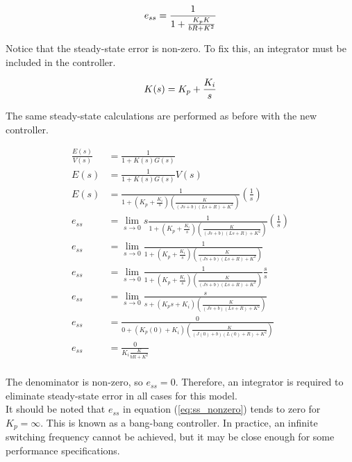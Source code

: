 \documentclass[10pt,conference,compsoc]{IEEEtran}
\begin{document}
\begin{equation} \label{eq:ss_nonzero}
  e_{ss} = \frac{1}{1 + \frac{K_p K}{bR+K^2}} \\
\end{equation}

\noindent Notice that the steady-state error is non-zero. To fix this, an
integrator must be included in the controller.

\begin{equation*}
  K(s) = K_p + \frac{K_i}{s} \\
\end{equation*}

\noindent The same steady-state calculations are performed as before with the
new controller.

\begin{align*}
  \frac{E(s)}{V(s)} &= \frac{1}{1 + K(s)G(s)} \\
  E(s) &= \frac{1}{1 + K(s)G(s)} V(s) \\
  E(s) &= \frac{1}{1 + \left(K_p + \frac{K_i}{s}\right)
    \left(\frac{K}{(Js+b)(Ls+R)+K^2}\right)} \left(\frac{1}{s}\right) \\
  e_{ss} &= \lim_{s\to0} s \frac{1}{1 + \left(K_p + \frac{K_i}{s}\right)
    \left(\frac{K}{(Js+b)(Ls+R)+K^2}\right)} \left(\frac{1}{s}\right) \\
  e_{ss} &= \lim_{s\to0} \frac{1}{1 + \left(K_p + \frac{K_i}{s}\right)
    \left(\frac{K}{(Js+b)(Ls+R)+K^2}\right)} \\
  e_{ss} &= \lim_{s\to0} \frac{1}{1 + \left(K_p + \frac{K_i}{s}\right)
    \left(\frac{K}{(Js+b)(Ls+R)+K^2}\right)} \frac{s}{s} \\
  e_{ss} &= \lim_{s\to0} \frac{s}{s + \left(K_p s + K_i\right)
    \left(\frac{K}{(Js+b)(Ls+R)+K^2}\right)} \\
  e_{ss} &= \frac{0}{0 + (K_p (0) + K_i)
    \left(\frac{K}{(J(0)+b)(L(0)+R)+K^2}\right)} \\
  e_{ss} &= \frac{0}{K_i \frac{K}{bR+K^2}} \\
\end{align*}

\noindent The denominator is non-zero, so $e_{ss} = 0$. Therefore, an integrator
is required to eliminate steady-state error in all cases for this model. \\

\noindent It should be noted that $e_{ss}$ in equation (\ref{eq:ss_nonzero})
tends to zero for $K_p = \infty$. This is known as a bang-bang controller. In
practice, an infinite switching frequency cannot be achieved, but it may be
close enough for some performance specifications.
\end{document}
